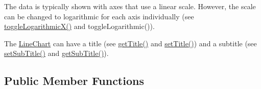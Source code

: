 The data is typically shown with axes that use a linear scale. However, the scale can be changed to logarithmic for each axis individually (see \mbox{\hyperlink{classbridges_1_1base_1_1_line_chart_ad3e5e54c382ac605a81b6b61c250ad16}{toggle\+Logarithmic\+X()}} and toggle\+Logarithmic()).

The \mbox{\hyperlink{classbridges_1_1base_1_1_line_chart}{Line\+Chart}} can have a title (see \mbox{\hyperlink{classbridges_1_1base_1_1_line_chart_aedc5f75b158298b755ba0c31bcf84138}{get\+Title()}} and \mbox{\hyperlink{classbridges_1_1base_1_1_line_chart_a893519da804666988c49b918c87da2a2}{set\+Title()}}) and a subtitle (see \mbox{\hyperlink{classbridges_1_1base_1_1_line_chart_ad24bfdd49194f8e152fdb80e039762ad}{set\+Sub\+Title()}} and \mbox{\hyperlink{classbridges_1_1base_1_1_line_chart_a102006e90f2a226886538db0eeda6b08}{get\+Sub\+Title()}}). \subsection*{Public Member Functions}
